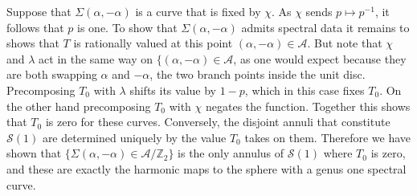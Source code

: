 \documentclass{article}
\begin{document}
Suppose that $\Sigma(\alpha,-\alpha)$ is a curve that is fixed by $\chi$. As $\chi$ sends $p \mapsto p^{-1}$, it follows that $p$ is one. To show that $\Sigma(\alpha,-\alpha)$ admits spectral data it remains to shows that $T$ is rationally valued at this point $(\alpha,-\alpha) \in \mathcal{A}$. But note that $\chi$ and $\lambda$ act in the same way on $\{(\alpha,-\alpha) \in \mathcal{A}$, as one would expect because they are both swapping $\alpha$ and $-\alpha$, the two branch points inside the unit disc. Precomposing $T_0$ with $\lambda$ shifts its value by $1-p$, which in this case fixes $T_0$. On the other hand precomposing $T_0$ with $\chi$ negates the function. Together this shows that $T_0$ is zero for these curves. Conversely, the disjoint annuli that constitute $\mathcal{S}(1)$ are determined uniquely by the value $T_0$ takes on them.
Therefore we have shown that $\{\Sigma(\alpha,-\alpha) \in \mathcal{A}/\mathbb{Z}_2\}$ is the only annulus of $\mathcal{S}(1)$ where $T_0$ is zero, and these are exactly the harmonic maps to the sphere with a genus one spectral curve.
\end{document}
